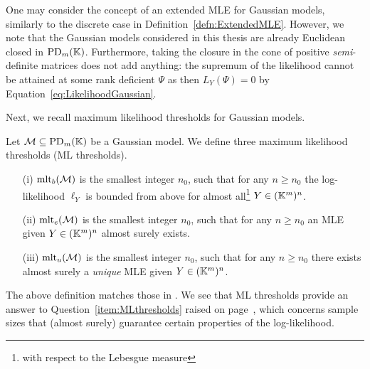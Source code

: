 \begin{remark}\label{rem:ExtendedMLEGaussian}
	One may consider the concept of an extended MLE for Gaussian models, similarly to the discrete case in Definition~\ref{defn:ExtendedMLE}. However, we note that the Gaussian models considered in this thesis are already Euclidean closed in $\operatorname{PD}_m(\mathbb K)$. Furthermore, taking the closure in the cone of positive \emph{semi}-definite matrices does not add anything: the supremum of the likelihood cannot be attained at some rank deficient $\Psi$ as then $L_Y(\Psi) = 0$ by Equation~\eqref{eq:LikelihoodGaussian}.
	\hfill\remSymbol
\end{remark}

Next, we recall maximum likelihood thresholds for Gaussian models. 

\begin{defn}[ML Thresholds]\label{defn:MLthresholds} %
	Let $\mathcal{M} \subseteq \operatorname{PD}_m(\mathbb K)$ be a Gaussian model. We define three maximum likelihood thresholds (ML thresholds).
	\begin{itemize}
		\item[(i)] $\operatorname{mlt}_b(\mathcal{M})$ is the smallest integer $n_0$, such that for any $n \geq n_0$ the log-likelihood $\ell_Y$ is bounded from above for almost all\footnote{with respect to the Lebesgue measure} $Y \in (\mathbb K^m)^n$.
		
		\item[(ii)] $\operatorname{mlt}_e(\mathcal{M})$ is the smallest integer $n_0$, such that for any $n \geq n_0$ an MLE given $Y \in (\mathbb K^m)^n$ almost surely exists.
		
		\item[(iii)] $\operatorname{mlt}_u(\mathcal{M})$ is the smallest integer $n_0$, such that for any $n \geq n_0$ there exists almost surely a \emph{unique} MLE given $Y \in (\mathbb K^m)^n$.
		\hfill{}
	\end{itemize}
\end{defn}

\cite{dempster1972covariance}


The above definition matches those in \cite{DrtonKurikiHoff, DM21MatrixNormal, DMW22TensorNormal}. We see that ML thresholds provide an answer to Question~\ref{item:MLthresholds} raised on page~\pageref{item:MLthresholds}, which concerns sample sizes that (almost surely) guarantee certain properties of the log-likelihood.

